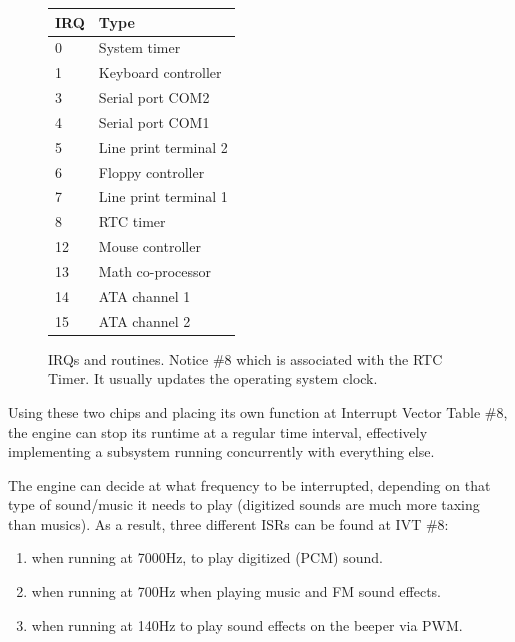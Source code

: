 \par
\begin{figure}[H]
\centering
\begin{tabularx}{\textwidth}{ X X  }
  \toprule
  \textbf{IRQ} & \textbf{Type} \\ \bottomrule
0 & System timer \\
1 & Keyboard controller \\
3 & Serial port COM2 \\ 
4 & Serial port COM1 \\
5 & Line print terminal 2 \\
6 & Floppy controller \\
7 & Line print terminal 1 \\
8 & RTC timer \\
12 & Mouse controller \\
13 & Math co-processor \\
14 & ATA channel 1 \\
15 & ATA channel 2  \\
\bottomrule
\end{tabularx}
\caption{IRQs and routines. Notice \#8 which is associated with the RTC Timer. It usually updates the operating system clock.}
\end{figure}
Using these two chips and placing its own function at Interrupt Vector Table \#8, the engine can stop its runtime at a regular time interval, effectively implementing a subsystem running concurrently with everything else.\\
\par
The engine can decide at what frequency to be interrupted, depending on that type of sound/music it needs to play (digitized sounds are much more taxing than musics). As a result, three different ISRs can be found at IVT \#8: 
\begin{enumerate}
\item {} when running at 7000Hz, to play digitized (PCM) sound.
\item {} when running at 700Hz when playing music and FM sound effects.
\item {} when running at 140Hz to play sound effects on the beeper via PWM.
\end{enumerate}
\par



